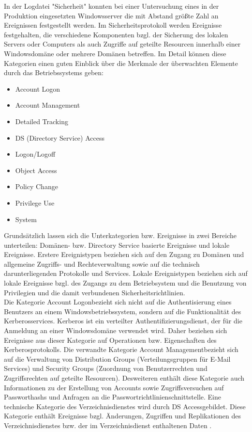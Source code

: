 In der Logdatei "Sicherheit" konnten bei einer Untersuchung eines in der Produktion eingesetzten Windowsserver die mit Abstand größte Zahl an Ereignissen festgestellt werden. Im Sicherheitsprotokoll werden Ereignisse festgehalten, die verschiedene Komponenten bzgl. der Sicherung des lokalen Servers oder Computers als auch Zugriffe auf geteilte Resourcen innerhalb einer Windowsdomäne oder mehrere Domänen betreffen. Im Detail können diese Kategorien einen guten Einblick über die Merkmale der überwachten Elemente durch das Betriebssystems geben:
\begin{itemize}
\item Account Logon
\item Account Management
\item Detailed Tracking
\item DS (Directory Service) Access
\item Logon/Logoff
\item Object Access
\item Policy Change
\item Privilege Use
\item System
\end{itemize}
Grundsätzlich lassen sich die Unterkategorien bzw. Ereignisse in zwei Bereiche unterteilen: Domänen- bzw. Directory Service basierte Ereignisse und lokale Ereignisse. Erstere Ereignistypen beziehen sich auf den Zugang zu Domänen und allgemeine Zugriffs- und Rechteverwaltung sowie auf die technisch darunterliegenden Protokolle und Services. Lokale Ereignistypen beziehen sich auf lokale Ereignisse bzgl. des Zugangs zu dem Betriebsystem und die Benutzung von Privilegien und die damit verbundenen Sicherheitsrichtlinien\citep{MS3}. \\

Die Kategorie \glqq Account Logon\grqq  bezieht sich nicht auf die Authentisierung eines Benutzers an einem Windowsbetriebssystem, sondern auf die Funktionalität des Kerberosservices. Kerberos ist ein verteilter Authentifizierungsdienst, der für die Anmeldung an einer Windowsdomäne verwendet wird.  Daher beziehen sich Ereignisse aus dieser Kategorie auf Operationen bzw. Eigenschaften des Kerberosprotokolls. Die verwandte Kategorie \glqq Account Management\grqq  bezieht sich auf die Verwaltung von Distribution Groups (Verteilungsgruppen für E-Mail Services) und Security Groups (Zuordnung von Benutzerrechten und Zugriffsrechten auf geteilte Resourcen). Desweiteren enthält diese Kategorie auch Informationen zu der Erstellung von Accounts sowie Zugriffsversuchen auf Passworthashs und Anfragen an die Passwortrichtlinienschnittstelle. 
Eine technische Kategorie des Verzeichnisdienstes wird durch \glqq DS Access\grqq   gebildet. Diese Kategorie enthält Ereignisse bzgl. Änderungen, Zugriffen und Replikationen des Verzeichnisdienstes bzw. der im Verzeichnisdienst enthaltenen Daten \citep{MS3}. \\

